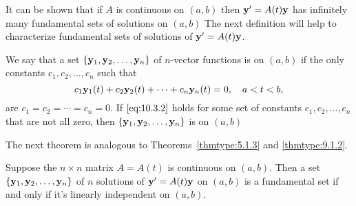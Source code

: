 \documentclass{ximera}
\begin{document}
It can be shown that if $A$ is continuous on $(a,b)$ then ${\bf
y}'=A(t){\bf y}$ has infinitely many fundamental sets of solutions on
$(a,b)$ %
The next
definition will help to characterize fundamental sets of solutions of
${\bf y}'=A(t){\bf y}$.


We say that a set $\{{\bf y}_1,{\bf y}_2,\dots,{\bf y}_n\}$ of
$n$-vector functions is  on $(a,b)$ if the
only constants $c_1, c_2, \dots, c_n$ such that
\begin{equation} \label{eq:10.3.2}
 c_1{\bf y}_1(t)+c_2{\bf y}_2(t)+\cdots+c_n{\bf y}_n(t)=0,\quad
a<t<b,
\end{equation}
are $c_1=c_2=\cdots=c_n=0$. If $\eqref{eq:10.3.2}$ holds for some set of
constants $c_1, c_2, \dots, c_n$ that are not all zero, then $\{{\bf
y}_1,{\bf y}_2,\dots,{\bf y}_n\}$ is  on
$(a,b)$

The next theorem is analogous to
Theorems~\ref{thmtype:5.1.3} and
\ref{thmtype:9.1.2}.

\begin{theorem}\label{thmtype:10.3.1}
Suppose the $n\times n$ matrix $A=A(t)$ is continuous on $(a,b)$.
Then a set
$\{{\bf y}_1,{\bf y}_2,\dots,{\bf y}_n\}$ of $n$ solutions of ${\bf
y}'=A(t){\bf y}$ on $(a,b)$ is a fundamental set if and only if it's
linearly independent on $(a,b)$.
\end{theorem}
\end{document}
